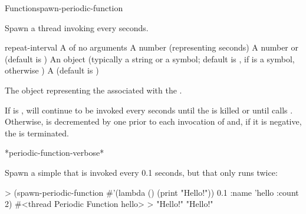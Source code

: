 
\begin{functiondoc}{Function}{spawn-periodic-function}%
  { 
     
    \returns{} }
%
%

\fnsyntax

\fnpurpose Spawn a thread invoking  every
 seconds.

\fnpackage {}

\fnmodule {}

\fnargs
\begin{args}{repeat-interval}
\arg[function] A  of no arguments
 A number (representing seconds)
\arg[count] A number or \nil{} (default is \nil)
\arg[name] An object (typically a string or a symbol; default is
, if  is a symbol, otherwise \nil)
\arg[verbose] A 
  (default is \textbf{})
\end{args}

\fnreturns The object representing the  associated with the
.

\fnerrors
\nothreads{}

\fndescription If  is \nil,  will continue to be
invoked every  seconds until the
  is killed or until 
calls \textbf{}.  Otherwise,  is
decremented by one prior to each invocation of  and, if it is
negative, the  is terminated.

\begin{alsos}{*periodic-function-verbose*}
\end{alsos}

\fnexamples 
Spawn a simple  that is invoked every 0.1 seconds,
but that only runs twice:
\begin{example}
> (spawn-periodic-function #'(lambda () (print "Hello!")) 0.1 
    :name 'hello
    :count 2)
#<thread Periodic Function hello>
>
"Hello!" 
"Hello!" 
\end{example}


\end{functiondoc}
